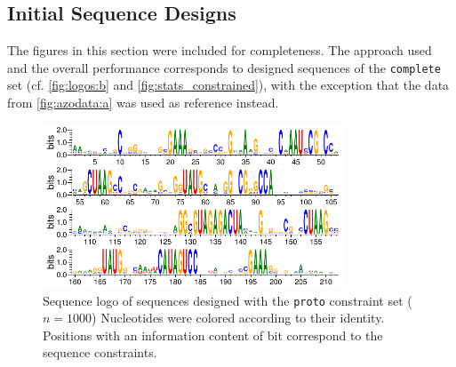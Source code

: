 \documentclass[../../master.tex]{subfiles}
\begin{document}
\subsection{Initial Sequence Designs}
\label{sub:appendix:protodesigns}

The figures in this section were included for completeness.
The approach used and the overall performance corresponds to designed sequences of the \texttt{complete} set (cf. \autoref{fig:logos:b} and \ref{fig:stats_constrained}), with the exception that the data from \autoref{fig:azodata:a} was used as reference instead.

\begin{figure}[!ht]
	\centering
	\includegraphics[trim=0 0 0 0, clip, width=0.8\textwidth]{pic/results/designs/logos/logo-proto.pdf}
	\caption[Nucleotide Composition of Initial Constrained Designs]{
		Sequence logo of sequences designed with the \texttt{proto} constraint set ($n = 1000$)
		Nucleotides were colored according to their identity.
		Positions with an information content of \unit[2]{bit} correspond to the sequence constraints.
	}\label{fig:protologo}
\end{figure}
\end{document}
